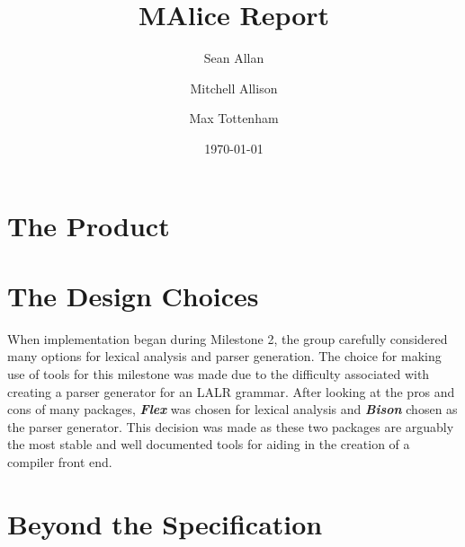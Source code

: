 \documentclass[a4wide, 11pt]{article}
\begin{document}
\title{MAlice Report}

\author{Sean Allan \and Mitchell Allison \and Max Tottenham}

\date{\today}         %

\maketitle            %

\begin{comment}
\section{Introduction}
 
This report outlines the development of the group's compiler for the MAlice
language into x86-64 and ARM assembly code, from the design stages to 
implementation and extension. Throughout the project, careful attention was
given to design, the tools and language used and ensuring functional
correctness.
\end{comment}

\section{The Product}

\section{The Design Choices}

When implementation began during Milestone 2, the group carefully considered
many options for lexical analysis and parser generation. The choice for making 
use of tools for this milestone was made due to the difficulty associated with
creating a parser generator for an LALR grammar. After looking at the
pros and cons of many packages, {\bf\emph{Flex}} was chosen for lexical analysis
and {\bf\emph{Bison}} chosen as the parser generator. This decision was made as 
these two packages are arguably the most stable and well documented tools for 
aiding in the creation of a compiler front end.

\section{Beyond the Specification}

\enddocument
\end{document}
